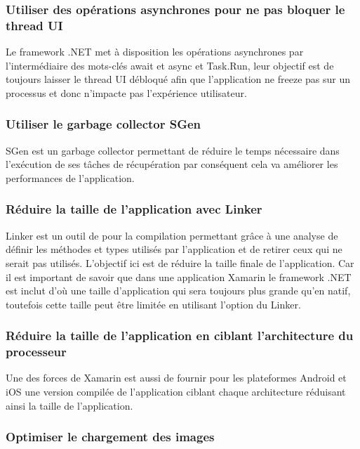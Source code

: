 \documentclass[11]{article}
\begin{document}
\subsubsection{Utiliser des opérations asynchrones pour ne pas bloquer le thread UI}
  
Le framework .NET met à disposition les opérations asynchrones par l’intermédiaire des mots-clés await et async et Task.Run, leur objectif est de toujours laisser le thread UI débloqué afin que l’application ne freeze pas sur un processus et donc n’impacte pas l’expérience utilisateur.
 
\subsubsection{Utiliser le garbage collector SGen}
  
SGen est un garbage collector permettant de réduire le temps nécessaire dans l'exécution de ses tâches de récupération par conséquent cela va améliorer les performances de l’application.
 
\subsubsection{Réduire la taille de l’application avec Linker}
  
Linker est un outil de pour la compilation permettant grâce à une analyse de définir les méthodes et types utilisés par l’application et de retirer ceux qui ne serait pas utilisés. L’objectif ici est de réduire la taille finale de l’application. Car il est important de savoir que dans une application Xamarin le framework .NET est inclut d'où une taille d’application qui sera toujours plus grande qu’en natif, toutefois cette taille peut être limitée en utilisant l’option du Linker.
 
\subsubsection{Réduire la taille de l’application en ciblant l’architecture du processeur}

Une des forces de Xamarin est aussi de fournir pour les plateformes Android et iOS une version compilée de l’application ciblant chaque architecture réduisant ainsi la taille de l’application.

\subsubsection{Optimiser le chargement des images}
\end{document}
